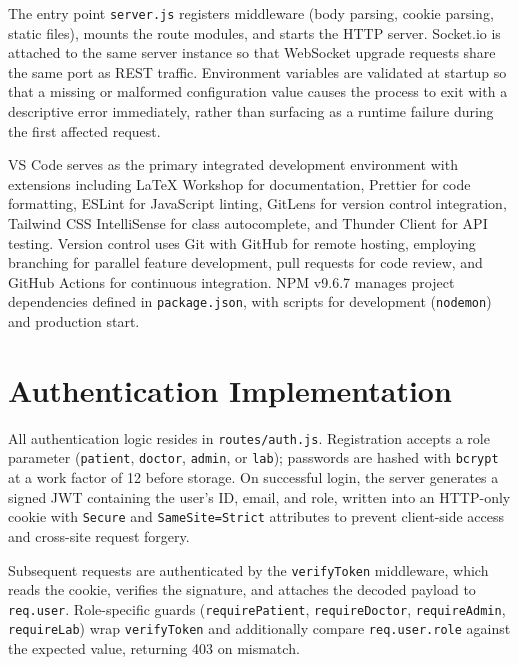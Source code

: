 \justifying
\noindent The entry point \texttt{server.js} registers middleware (body parsing, cookie parsing, static files), mounts the route modules, and starts the HTTP server. Socket.io is attached to the same server instance so that WebSocket upgrade requests share the same port as REST traffic. Environment variables are validated at startup so that a missing or malformed configuration value causes the process to exit with a descriptive error immediately, rather than surfacing as a runtime failure during the first affected request.

\justifying
\noindent VS Code serves as the primary integrated development environment with extensions including LaTeX Workshop for documentation, Prettier for code formatting, ESLint for JavaScript linting, GitLens for version control integration, Tailwind CSS IntelliSense for class autocomplete, and Thunder Client for API testing. Version control uses Git with GitHub for remote hosting, employing branching for parallel feature development, pull requests for code review, and GitHub Actions for continuous integration. NPM v9.6.7 manages project dependencies defined in \texttt{package.json}, with scripts for development (\texttt{nodemon}) and production start.

\section{Authentication Implementation}
\label{sec:auth}

\justifying
\noindent All authentication logic resides in \texttt{routes/auth.js}. Registration accepts a role parameter (\texttt{patient}, \texttt{doctor}, \texttt{admin}, or \texttt{lab}); passwords are hashed with \texttt{bcrypt} at a work factor of 12 before storage. On successful login, the server generates a signed JWT containing the user's ID, email, and role, written into an HTTP-only cookie with \texttt{Secure} and \texttt{SameSite=Strict} attributes to prevent client-side access and cross-site request forgery.

\justifying
\noindent Subsequent requests are authenticated by the \texttt{verifyToken} middleware, which reads the cookie, verifies the signature, and attaches the decoded payload to \texttt{req.user}. Role-specific guards (\texttt{requirePatient}, \texttt{requireDoctor}, \texttt{requireAdmin}, \texttt{requireLab}) wrap \texttt{verifyToken} and additionally compare \texttt{req.user.role} against the expected value, returning 403 on mismatch.

